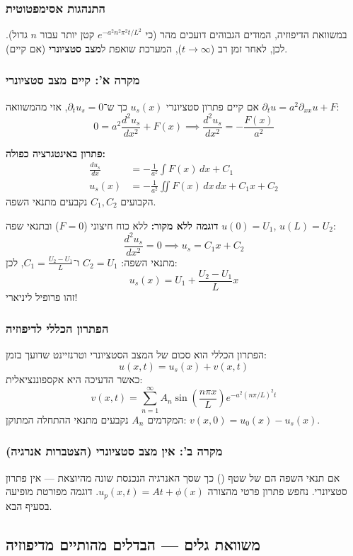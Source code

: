 \subsubsection{התנהגות אסימפטוטית}
במשוואת הדיפוזיה, המודים הגבוהים דועכים מהר (כי $e^{-a^2 n^2 \pi^2 t / L^2}$ קטן יותר עבור $n$ גדול). לכן, לאחר זמן רב ($t \to \infty$), המערכת שואפת ל\textbf{מצב סטציונרי} (אם קיים).

\subsubsection{מקרה א': קיים מצב סטציונרי}
אם קיים פתרון סטציונרי $u_s(x)$ כך ש־$\partial_t u_s=0$, אזי מהמשוואה $\partial_t u = a^2 \partial_{xx} u + F$:
\[
0 = a^2\frac{d^2 u_s}{dx^2}+F(x) \implies \boxed{\frac{d^2 u_s}{dx^2} = -\frac{F(x)}{a^2}}
\]

\textbf{פתרון באינטגרציה כפולה:}
\begin{align*}
\frac{du_s}{dx} &= -\frac{1}{a^2}\int F(x)\,dx + C_1 \\
u_s(x) &= -\frac{1}{a^2}\iint F(x)\,dx\,dx + C_1 x + C_2
\end{align*}
הקבועים $C_1, C_2$ נקבעים מתנאי השפה.

\textbf{דוגמה ללא מקור:} ללא כוח חיצוני ($F=0$) ובתנאי שפה $u(0)=U_1$, $u(L)=U_2$:
\[
\frac{d^2 u_s}{dx^2} = 0 \implies u_s = C_1 x + C_2
\]
מתנאי השפה: $C_2 = U_1$ ו־$C_1 = \frac{U_2-U_1}{L}$, לכן:
\[
u_s(x)=U_1+\frac{U_2-U_1}{L}x
\]
זהו פרופיל ליניארי!

\subsubsection{הפתרון הכללי לדיפוזיה}
הפתרון הכללי הוא סכום של המצב הסטציונרי וטרנזיינט שדועך בזמן:
\[
\boxed{u(x,t)=u_s(x)+v(x,t)}
\]
כאשר הדעיכה היא אקספוננציאלית:
\[
v(x,t)=\sum_{n=1}^\infty A_n \sin\!\left(\frac{n\pi x}{L}\right) e^{-a^2(n\pi/L)^2 t}
\]
המקדמים $A_n$ נקבעים מתנאי ההתחלה המתוקן: $v(x,0) = u_0(x) - u_s(x)$.



\subsubsection{מקרה ב': אין מצב סטציונרי (הצטברות אנרגיה)}
אם תנאי השפה הם של שטף () כך שסך האנרגיה הנכנסת שונה מהיוצאת — אין פתרון סטציונרי. נחפש פתרון פרטי מהצורה $u_p(x,t) = At + \phi(x)$. דוגמה מפורטת מופיעה בסעיף הבא.

\subsection{משוואת גלים — הבדלים מהותיים מדיפוזיה}

